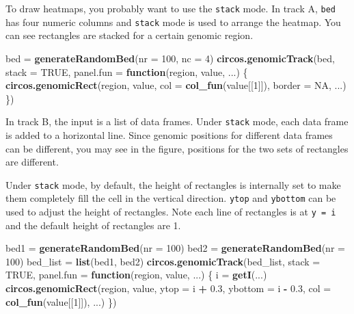 \documentclass[]{book}
\newenvironment{Shaded}{\begin{snugshade}}{\end{snugshade}}
\newcommand{\KeywordTok}[1]{\textcolor[rgb]{0.13,0.29,0.53}{\textbf{#1}}}
\newcommand{\DataTypeTok}[1]{\textcolor[rgb]{0.13,0.29,0.53}{#1}}
\newcommand{\DecValTok}[1]{\textcolor[rgb]{0.00,0.00,0.81}{#1}}
\newcommand{\FloatTok}[1]{\textcolor[rgb]{0.00,0.00,0.81}{#1}}
\newcommand{\StringTok}[1]{\textcolor[rgb]{0.31,0.60,0.02}{#1}}
\newcommand{\OtherTok}[1]{\textcolor[rgb]{0.56,0.35,0.01}{#1}}
\newcommand{\ControlFlowTok}[1]{\textcolor[rgb]{0.13,0.29,0.53}{\textbf{#1}}}
\newcommand{\OperatorTok}[1]{\textcolor[rgb]{0.81,0.36,0.00}{\textbf{#1}}}
\newcommand{\NormalTok}[1]{#1}
\theoremstyle{definition}
\theoremstyle{definition}
\theoremstyle{remark}
\begin{document}
To draw heatmaps, you probably want to use the \texttt{stack} mode. In
track A, \texttt{bed} has four numeric columns and \texttt{stack} mode
is used to arrange the heatmap. You can see rectangles are stacked for a
certain genomic region.

\begin{Shaded}
\begin{Highlighting}[]
\NormalTok{bed =}\StringTok{ }\KeywordTok{generateRandomBed}\NormalTok{(}\DataTypeTok{nr =} \DecValTok{100}\NormalTok{, }\DataTypeTok{nc =} \DecValTok{4}\NormalTok{)}
\KeywordTok{circos.genomicTrack}\NormalTok{(bed, }\DataTypeTok{stack =} \OtherTok{TRUE}\NormalTok{, }
    \DataTypeTok{panel.fun =} \ControlFlowTok{function}\NormalTok{(region, value, ...) \{}
        \KeywordTok{circos.genomicRect}\NormalTok{(region, value, }\DataTypeTok{col =} \KeywordTok{col_fun}\NormalTok{(value[[}\DecValTok{1}\NormalTok{]]), }\DataTypeTok{border =} \OtherTok{NA}\NormalTok{, ...)}
\NormalTok{\})}
\end{Highlighting}
\end{Shaded}

In track B, the input is a list of data frames. Under \texttt{stack}
mode, each data frame is added to a horizontal line. Since genomic
positions for different data frames can be different, you may see in the
figure, positions for the two sets of rectangles are different.

Under \texttt{stack} mode, by default, the height of rectangles is
internally set to make them completely fill the cell in the vertical
direction. \texttt{ytop} and \texttt{ybottom} can be used to adjust the
height of rectangles. Note each line of rectangles is at
\texttt{y\ =\ i} and the default height of rectangles are 1.

\begin{Shaded}
\begin{Highlighting}[]
\NormalTok{bed1 =}\StringTok{ }\KeywordTok{generateRandomBed}\NormalTok{(}\DataTypeTok{nr =} \DecValTok{100}\NormalTok{)}
\NormalTok{bed2 =}\StringTok{ }\KeywordTok{generateRandomBed}\NormalTok{(}\DataTypeTok{nr =} \DecValTok{100}\NormalTok{)}
\NormalTok{bed_list =}\StringTok{ }\KeywordTok{list}\NormalTok{(bed1, bed2)}
\KeywordTok{circos.genomicTrack}\NormalTok{(bed_list, }\DataTypeTok{stack =} \OtherTok{TRUE}\NormalTok{, }
    \DataTypeTok{panel.fun =} \ControlFlowTok{function}\NormalTok{(region, value, ...) \{}
\NormalTok{        i =}\StringTok{ }\KeywordTok{getI}\NormalTok{(...)}
        \KeywordTok{circos.genomicRect}\NormalTok{(region, value, }\DataTypeTok{ytop =}\NormalTok{ i }\OperatorTok{+}\StringTok{ }\FloatTok{0.3}\NormalTok{, }\DataTypeTok{ybottom =}\NormalTok{ i }\OperatorTok{-}\StringTok{ }\FloatTok{0.3}\NormalTok{,}
            \DataTypeTok{col =} \KeywordTok{col_fun}\NormalTok{(value[[}\DecValTok{1}\NormalTok{]]), ...)}
\NormalTok{\})}
\end{Highlighting}
\end{Shaded}
\end{document}
